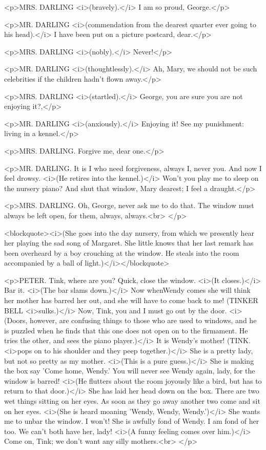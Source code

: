 <p>MRS. DARLING <i>(bravely).</i> I am so proud, George.</p>

<p>MR. DARLING <i>(commendation from the dearest quarter ever going
to his head).</i> I have been put on a picture postcard, dear.</p>

<p>MRS. DARLING <i>(nobly).</i> Never!</p>

<p>MR. DARLING <i>(thoughtlessly).</i> Ah, Mary, we should not be
such celebrities if the children hadn't flown away.</p>

<p>MRS. DARLING <i>(startled).</i> George, you are sure you are not
enjoying it?,</p>

<p>MR. DARLING <i>(anxiously).</i> Enjoying it! See my punishment:
living in a kennel.</p>

<p>MRS. DARLING. Forgive me, dear one.</p>

<p>MR. DARLING. It is I who need forgiveness, always I, never you.
And now I feel drowsy. <i>(He retires into the kennel.)</i> Won't you
play me to sleep on the nursery piano? And shut that window, Mary
dearest; I feel a draught.</p>

<p>MRS. DARLING. Oh, George, never ask me to do that. The window must
always be left open, for them, always, always.<br>
</p>

<blockquote><i>(She goes into the day nursery, from which we
presently hear her playing the sad song of Margaret. She little knows
that her last remark has been overheard by a boy crouching at the
window. He steals into the room accompanied by a ball of
light.)</i></blockquote>

<p>PETER. Tink, where are you? Quick, close the window. <i>(It
closes.)</i> Bar it. <i>(The bar slams down.)</i> Now whenWendy comes
she will think her mother has barred her out, and she will have to
come back to me! (TINKER BELL <i>sulks.)</i> Now, Tink, you and I
must go out by the door. <i>(Doors, however, are confusing things to
those who are used to windows, and he is puzzled when he finds that
this one does not open on to the firmament. He tries the other, and
sees the piano player.)</i> It is Wendy's mother! (TINK. <i>pops on
to his shoulder and they peep together.)</i> She is a pretty lady,
but not so pretty as my mother. <i>(This is a pure guess.)</i> She is
making the box say 'Come home, Wendy.' You will never see Wendy
again, lady, for the window is barred! <i>(He flutters about the room
joyously like a bird, but has to return to that door.)</i> She has
laid her head down on the box. There are two wet things sitting on
her eyes. As soon as they go away another two come and sit on her
eyes. <i>(She is heard moaning 'Wendy, Wendy, Wendy.')</i> She wants
me to unbar the window. I won't! She is awfully fond of Wendy. I am
fond of her too. We can't both have her, lady! <i>(A funny feeling
comes over him.)</i> Come on, Tink; we don't want any silly
mothers.<br>
</p>

